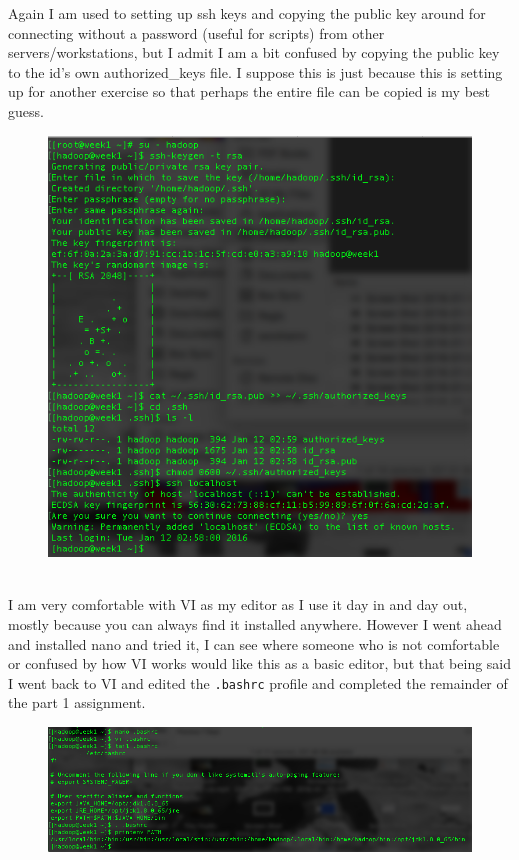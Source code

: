\documentclass[10pt]{article}
\begin{document}
Again I am used to setting up ssh keys and copying the public key around for connecting without a password (useful for scripts) from other servers/workstations, but I admit I am a bit confused by copying the public key to the id's own authorized\_keys file. I suppose this is just because this is setting up for another exercise so that perhaps the entire file can be copied is my best guess.
\begin{figure}[!h]
\includegraphics[scale=0.37]{ssh.png}
\centering
\end{figure}\\
I am very comfortable with VI as my editor as I use it day in and day out, mostly because you can always find it installed anywhere. However I went ahead and installed nano and tried it, I can see where someone who is not comfortable or confused by how VI works would like this as a basic editor, but that being said I went back to VI and edited the \verb|.bashrc| profile and completed the remainder of the part 1 assignment.
\pagebreak
\begin{figure}[!h]
\includegraphics[scale=0.37]{bashrc.png}
\centering
\end{figure}\\
\end{document}
